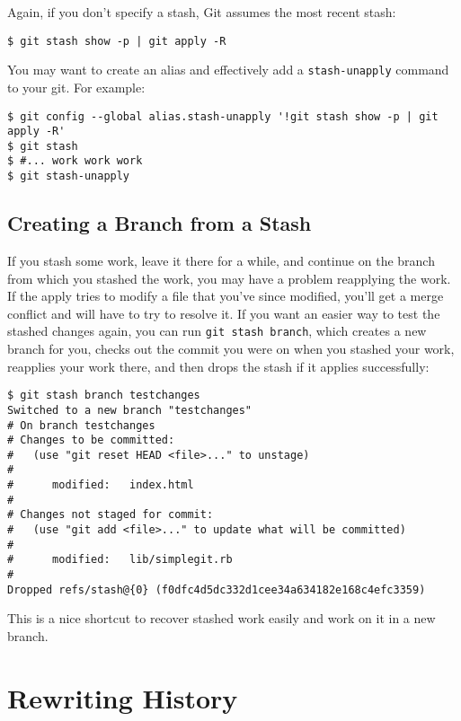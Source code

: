 \documentclass[a4paper]{book}
\begin{document}
Again, if you don't specify a stash, Git assumes the most recent stash:

\begin{shaded}\begin{verbatim}
$ git stash show -p | git apply -R
\end{verbatim}\end{shaded}

You may want to create an alias and effectively add a \texttt{stash-unapply} command to your git. For example:

\begin{shaded}\begin{verbatim}
$ git config --global alias.stash-unapply '!git stash show -p | git apply -R'
$ git stash
$ #... work work work
$ git stash-unapply
\end{verbatim}\end{shaded}

\subsection{Creating a Branch from a Stash}

If you stash some work, leave it there for a while, and continue on the branch from which you stashed the work, you may have a problem reapplying the work. If the apply tries to modify a file that you've since modified, you'll get a merge conflict and will have to try to resolve it. If you want an easier way to test the stashed changes again, you can run \texttt{git stash branch}, which creates a new branch for you, checks out the commit you were on when you stashed your work, reapplies your work there, and then drops the stash if it applies successfully:

\begin{shaded}\begin{verbatim}
$ git stash branch testchanges
Switched to a new branch "testchanges"
# On branch testchanges
# Changes to be committed:
#   (use "git reset HEAD <file>..." to unstage)
#
#      modified:   index.html
#
# Changes not staged for commit:
#   (use "git add <file>..." to update what will be committed)
#
#      modified:   lib/simplegit.rb
#
Dropped refs/stash@{0} (f0dfc4d5dc332d1cee34a634182e168c4efc3359)
\end{verbatim}\end{shaded}

This is a nice shortcut to recover stashed work easily and work on it in a new branch.

\section{Rewriting History}
\end{document}
